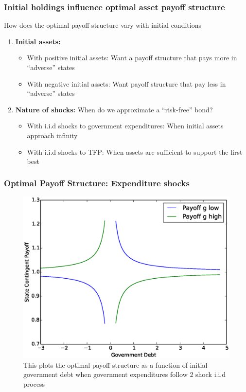 \documentclass{beamer}
\begin{document}
		
\begin{frame}		
   \frametitle{Initial holdings influence optimal asset payoff structure}
How does the optimal payoff structure vary with initial conditions
\begin{enumerate}
\item \textbf{Initial assets: }
\begin{itemize}

 \item With positive initial assets: Want a payoff structure that pays more in ``adverse'' states
 \item With negative initial assets: Want payoff structure that pay less in ``adverse'' states
\end{itemize}

 \item \textbf{Nature of shocks: } When do we approximate a ``risk-free'' bond?
 \begin{itemize}
  \item With i.i.d shocks to government expenditures: When initial assets approach  infinity
  \item With i.i.d  shocks to  TFP: When assets are sufficient to support the first best
 \end{itemize}

\end{enumerate}



  \end{frame}

  
  \begin{frame}
   \frametitle{Optimal Payoff Structure: Expenditure shocks}
	\begin{figure}
		\begin{center}
		\includegraphics[scale=.4]{Images/p_graph.eps}
		\caption{This plots the optimal payoff structure as a function of initial government debt when government expenditures follow 2 shock i.i.d process}
	\end{center}	 
	\end{figure}

  \end{frame}
\end{document}
